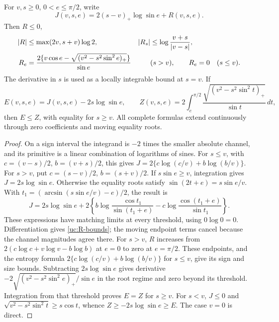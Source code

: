 \begin{lemma}\label{uc:cancellation-lemma}
For $v,s\geq0$, $0<e\leq\pi/2$, write
\[
 J(v,s,e)=2(s-v)_+\log\sin e+R(v,s,e).
\]
Then $R\leq0$,
\begin{align}\label{uc:R-bounds}
 |R|&\leq\max(2v,s+v)\log2,
 &|R_s|&\leq\log\frac{v+s}{|v-s|},\\
 R_e&=\frac{2\{v\cos e-\sqrt{(v^2-s^2\sin^2e)_+}\}}{\sin e}
 &&(s>v),\qquad R_e=0\quad(s\leq v).\notag
\end{align}
The derivative in $s$ is used as a locally integrable bound at $s=v$.
If
\begin{equation}\label{uc:root-Z}
 E(v,s,e)=J(v,s,e)-2s\log\sin e,\qquad
 Z(v,s,e)=2\int_e^{\pi/2}
       \frac{\sqrt{(v^2-s^2\sin^2t)_+}}{\sin t}\,dt,
\end{equation}
then $E\leq Z$, with equality for $s\geq v$.
All complete formulas extend continuously through zero coefficients
and moving equality roots.
\end{lemma}
\begin{proof}
On a sign interval the integrand is $-2$ times the smaller absolute
channel, and its primitive is a linear combination of logarithms of
sines. For $s\leq v$, with $c=(v-s)/2$, $b=(v+s)/2$, this gives
$J=2\{c\log(c/v)+b\log(b/v)\}$. For $s>v$, put
$c=(s-v)/2$, $b=(s+v)/2$. If $s\sin e\geq v$, integration gives
$J=2s\log\sin e$. Otherwise the equality roots satisfy
$\sin(2t+e)=s\sin e/v$. With
$t_1=(\arcsin(s\sin e/v)-e)/2$, the result is
\[
 J=2s\log\sin e+2\left\{
 b\log\frac{\cos t_1}{\sin(t_1+e)}
 -c\log\frac{\cos(t_1+e)}{\sin t_1}\right\}.
\]
These expressions have matching limits at every threshold, using
$0\log0=0$. Differentiation gives \eqref{uc:R-bounds}; the moving
endpoint terms cancel because the channel magnitudes agree there.
For $s>v$, $R$ increases from
$2(c\log c+v\log v-b\log b)$ at $e=0$ to zero at $e=\pi/2$.
These endpoints, and the entropy formula $2\{c\log(c/v)+b\log(b/v)\}$ for $s\leq v$, give its
sign and size bounds. Subtracting $2s\log\sin e$ gives derivative
$-2\sqrt{(v^2-s^2\sin^2e)_+}/\sin e$ in the root regime and zero
beyond its threshold. Integration from that threshold proves $E=Z$
for $s\geq v$. For $s<v$, $J\leq0$ and
$\sqrt{v^2-s^2\sin^2t}\geq s\cos t$, whence
$Z\geq-2s\log\sin e\geq E$. The case $v=0$ is direct.
\end{proof}

